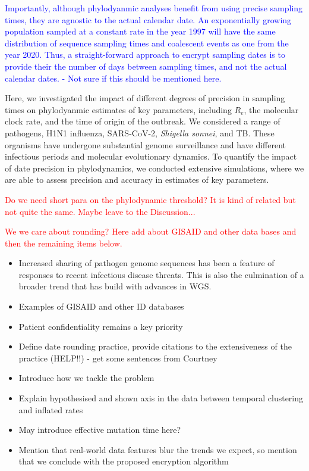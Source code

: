 \documentclass{article}
\begin{document}
\begin{spacing}{1.5}
\textcolor{blue}{Importantly, although phylodyanmic analyses benefit from using precise sampling times, they are agnostic to the actual calendar date. An exponentially growing population sampled at a constant rate in the year 1997 will have the same distribution of sequence sampling times and coalescent events as one from the year 2020. Thus, a straight-forward approach to encrypt sampling dates is to provide their the number of days between sampling times, and not the actual calendar dates. - Not sure if this should be mentioned here.}

Here, we investigated the impact of different degrees of precision in sampling times on phylodyanmic estimates of key parameters, including $R_e$, the molecular clock rate, and the time of origin of the outbreak. We considered a range of pathogens, H1N1 influenza, SARS-CoV-2, \textit{Shigella sonnei}, and TB. These organisms have undergone substantial genome surveillance and have different infectious periods and molecular evolutionary dynamics. To quantify the impact of date precision in phylodynamics, we conducted extensive simulations, where we are able to assess precision and accuracy in estimates of key parameters.




\textcolor{red}{Do we need short para on the phylodynamic threshold? It is kind of related but not quite the same. Maybe leave to the Discussion...}

\textcolor{red}{We we care about rounding? Here add about GISAID and other data bases and then the remaining items below. }


\begin{itemize}
    \item Increased sharing of pathogen genome sequences has been a feature of responses to recent infectious disease threats. This is also the culmination of a broader trend that has build with advances in WGS. 
    \item Examples of GISAID and other ID databases
    \item Patient confidentiality remains a key priority 
    \item Define date rounding practice, provide citations to the extensiveness of the practice (HELP!!) - get some sentences from Courtney
    \item Introduce how we tackle the problem
    \item Explain hypothesised and shown axis in the data between temporal clustering and inflated rates
    \item May introduce effective mutation time here?
    \item Mention that real-world data features blur the trends we expect, so mention that we conclude with the proposed encryption algorithm
\end{itemize}




\end{spacing}
\end{document}
